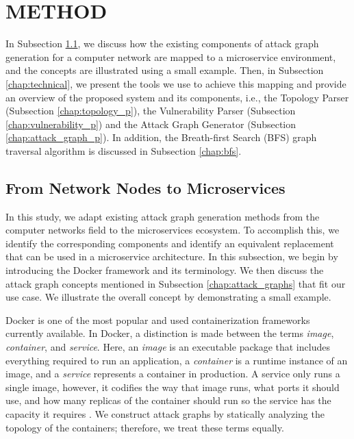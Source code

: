 \section{METHOD}
\label{chap:method}
In Subsection \ref{chap:mapping}, we discuss how the existing components of attack graph generation for a computer network are mapped to a microservice environment, and the concepts are illustrated using a small example. Then, in Subsection \ref{chap:technical}, we present the tools we use to achieve this mapping and provide an overview of the proposed system and its components, i.e., the Topology Parser (Subsection \ref{chap:topology_p}), the Vulnerability Parser (Subsection \ref{chap:vulnerability_p}) and the Attack Graph Generator (Subsection \ref{chap:attack_graph_p}). In addition, the Breath-first Search (BFS) graph traversal algorithm is discussed in Subsection \ref{chap:bfs}. 


\subsection{From Network Nodes to Microservices}
\label{chap:mapping}
In this study, we adapt existing attack graph generation methods from the computer networks field to the microservices ecosystem. To accomplish this, we identify the corresponding components and identify an equivalent replacement that can be used in a microservice architecture. In this subsection, we begin by introducing the Docker framework and its terminology. We then discuss the attack graph concepts mentioned in Subsection \ref{chap:attack_graphs} that fit our use case. We illustrate the overall concept by demonstrating a small example.

Docker is one of the most popular and used containerization frameworks currently available. In Docker, a distinction is made between the terms \textit{image}, \textit{container}, and \textit{service}. Here, an \textit{image} is an executable package that includes everything required to run an application, a \textit{container} is a runtime instance of an image, and a \textit{service} represents a container in production. A service only runs a single image, however, it codifies the way that image runs, what ports it should use, and how many replicas of the container should run so the service has the capacity it requires \cite{merkel2014docker}. We construct attack graphs by statically analyzing the topology of the containers; therefore, we treat these terms equally.  

